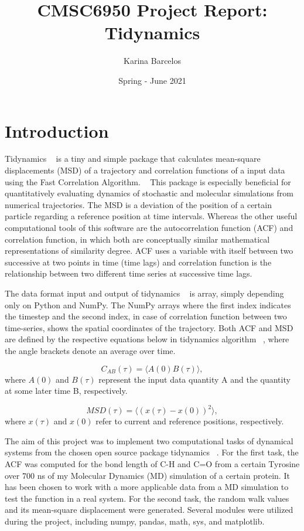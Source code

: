 \documentclass{article}
\title{CMSC6950 Project Report: Tidynamics}
\author{Karina Barcelos}
\date{Spring - June 2021}
\begin{document}
\maketitle

\section{Introduction}

Tidynamics ~\cite{Buyl2018} is a tiny and simple package that calculates mean-square displacements (MSD) of a trajectory and correlation functions of a input data using the Fast Correlation Algorithm. ~\cite{kneller1995nmoldyn} This package is especially beneficial for quantitatively evaluating dynamics of stochastic and molecular simulations from numerical trajectories. The MSD is a deviation of the position of a certain particle regarding a reference position at time intervals. Whereas the other useful computational tools of this software are the autocorrelation function (ACF) and correlation function, in which both are conceptually similar mathematical representations of similarity degree. ACF uses a variable with itself between two successive at two points in time (time lags) and correlation function is the relationship between two different time series at successive time lags.

The data format input and output of tidynamics ~\cite{Buyl2018} is array, simply depending only on Python and NumPy. The NumPy arrays where the first index indicates the timestep and the second index, in case of correlation function between two time-series, shows the spatial coordinates of the trajectory. Both ACF and MSD are defined by the respective equations below in tidynamics algorithm ~\cite{Buyl2018}, where the angle brackets denote an average over time. ~\cite{kneller1995nmoldyn}

\begin{equation}
C_{AB}(\tau) = \langle A(0) B(\tau) \rangle,
\label{correlation}
\end{equation}
where  $A(0)$ and $B(\tau)$ represent the input data quantity A and the quantity at some later time B, respectively.

\begin{equation}
MSD(\tau) = \langle (x(\tau) - x(0) )^2 \rangle,
\label{msd}
\end{equation}
where $x(\tau)$ and $x(0)$ refer to current and reference positions, respectively.

The aim of this project was to implement two computational tasks of dynamical systems from the chosen open source package tidynamics ~\cite{Buyl2018}. For the first task, the ACF was computed for the bond length of C-H and C=O from a certain Tyrosine over 700 ns of my Molecular Dynamics (MD) simulation of a certain protein. It has been chosen to work with a more applicable data from a MD simulation to test the function in a real system. For the second task, the random walk values and its mean-square displacement were generated. Several modules were utilized during the project, including numpy, pandas, math, sys, and matplotlib.
\end{document}
